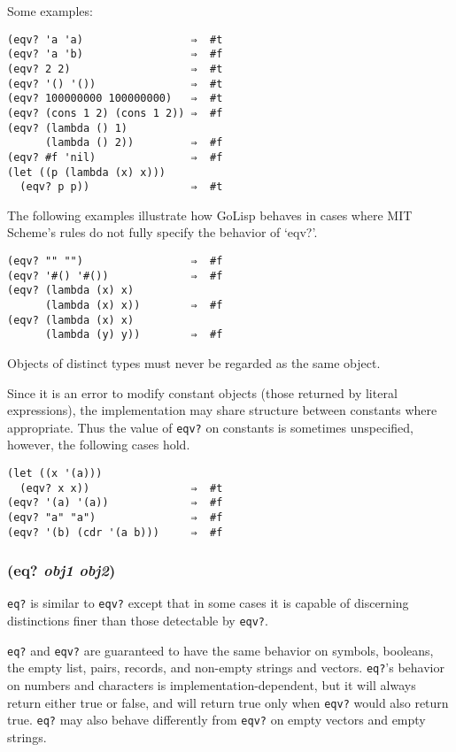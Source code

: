 \documentclass{article}
\begin{document}
Some examples:

\begin{verbatim}
(eqv? 'a 'a)                 ⇒  #t
(eqv? 'a 'b)                 ⇒  #f
(eqv? 2 2)                   ⇒  #t
(eqv? '() '())               ⇒  #t
(eqv? 100000000 100000000)   ⇒  #t
(eqv? (cons 1 2) (cons 1 2)) ⇒  #f
(eqv? (lambda () 1)
      (lambda () 2))         ⇒  #f
(eqv? #f 'nil)               ⇒  #f
(let ((p (lambda (x) x)))
  (eqv? p p))                ⇒  #t
\end{verbatim}

The following examples illustrate how GoLisp behaves in cases where MIT Scheme's rules do not
fully specify the behavior of `eqv?'.

\begin{verbatim}
(eqv? "" "")                 ⇒  #f
(eqv? '#() '#())             ⇒  #f
(eqv? (lambda (x) x)
      (lambda (x) x))        ⇒  #f
(eqv? (lambda (x) x)
      (lambda (y) y))        ⇒  #f
\end{verbatim}

Objects of distinct types must never be regarded as the same object.

Since it is an error to modify constant objects (those returned by literal expressions), the
implementation may share structure between constants where appropriate. Thus the value of
\verb|eqv?| on constants is sometimes unspecified, however, the following cases hold.

\begin{verbatim}
(let ((x '(a)))
  (eqv? x x))                ⇒  #t
(eqv? '(a) '(a))             ⇒  #f
(eqv? "a" "a")               ⇒  #f
(eqv? '(b) (cdr '(a b)))     ⇒  #f
\end{verbatim}

\subsubsection{(eq? \emph{obj1} \emph{obj2})}

\verb|eq?| is similar to \verb|eqv?| except that in some cases it is capable of discerning
distinctions finer than those detectable by \verb|eqv?|.

\verb|eq?| and \verb|eqv?| are guaranteed to have the same behavior on symbols, booleans,
the empty list, pairs, records, and non-empty strings and vectors. \verb|eq?|'s behavior on
numbers and characters is implementation-dependent, but it will always return either true or
false, and will return true only when \verb|eqv?| would also return true. \verb|eq?| may
also behave differently from \verb|eqv?| on empty vectors and empty strings.
\end{document}
